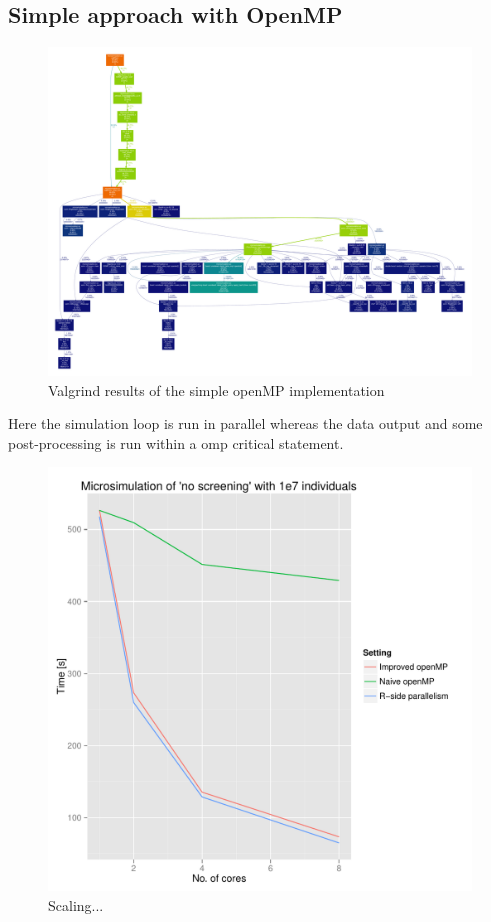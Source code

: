 \subsection{Simple approach with OpenMP}

\begin{figure}[!htbp]
  \centering
  \includegraphics[height=0.85\textheight, angle=90]{images/profOpenMPSimple.pdf}
  \caption{Valgrind results of the simple openMP implementation}
  \label{fig:simpleOpenMP}
\end{figure}

Here the simulation loop is run in parallel whereas the data output
and some post-processing is run within a omp critical statement.

\begin{figure}[!htbp]
  \centering
  \includegraphics[height=0.85\textheight]{images/implementationProfiling.pdf}
  \caption{Scaling...}
  \label{fig:scaling}
\end{figure}

